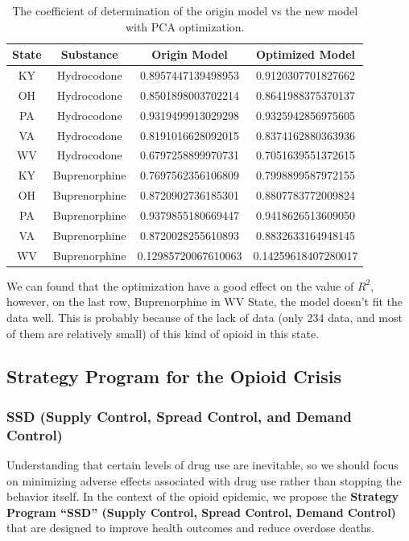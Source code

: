 \documentclass{mcmthesis}
\begin{document}
\begin{table}[H]
    \centering
    \begin{tabular}{|c|c|c|c|}
        \hline
        State & Substance & Origin Model & Optimized Model \\\hline
        KY & Hydrocodone & 0.8957447139498953 & 0.9120307701827662 \\
        OH & Hydrocodone & 0.8501898003702214 & 0.8641988375370137 \\
        PA & Hydrocodone & 0.9319499913029298 & 0.9325942856975605 \\
        VA & Hydrocodone & 0.8191016628092015 & 0.8374162880363936 \\
        WV & Hydrocodone & 0.6797258899970731 & 0.7051639551372615 \\
        KY & Buprenorphine & 0.7697562356106809 & 0.7998899587972155 \\
        OH & Buprenorphine & 0.8720902736185301 & 0.8807783772009824 \\
        PA & Buprenorphine & 0.9379855180669447 & 0.9418626513609050 \\
        VA & Buprenorphine & 0.8720028255610893 & 0.8832633164948145 \\
        WV & Buprenorphine & 0.12985720067610063 & 0.14259618407280017 \\
        \hline 
    \end{tabular}
    \caption{The coefficient of determination of the origin model vs the new model with PCA optimization.}
    \label{tab:final}
\end{table}

We can found that the optimization have a good effect on the value of $R^2$, however, on the last row, Buprenorphine in WV State, the model doesn't fit the data well. This is probably because of the lack of data (only 234 data, and most of them are relatively small) of this kind of opioid in this state.

\subsection{Strategy Program for the Opioid Crisis}\label{Sec:Strategy}

\subsubsection{SSD (Supply Control, Spread Control, and Demand Control) }
	
	Understanding that certain levels of drug use are inevitable, so we should focus on minimizing adverse effects associated with drug use rather than stopping the behavior itself. In the context of the opioid epidemic, we propose the \textbf{Strategy Program ``SSD'' (Supply Control, Spread Control, Demand Control)} that are designed to improve health outcomes and reduce overdose deaths.
	
\end{document}
